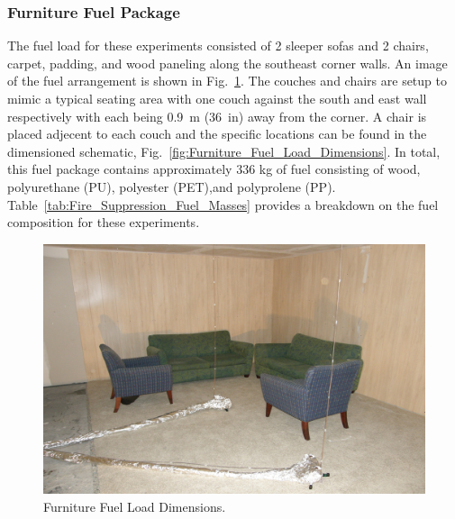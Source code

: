 \documentclass[12pt,oneside]{book}
\begin{document}
\clearpage

\subsubsection{Furniture Fuel Package}
\label{sec:fire_suppression_furniture_fuel}

The fuel load for these experiments consisted of 2 sleeper sofas and 2 chairs, carpet, padding, and wood paneling along the southeast corner walls. An image of the fuel arrangement is shown in Fig.~\ref{fig:Furniture_Fuel_Load}. The couches and chairs are setup to mimic a typical seating area with one couch against the south and east wall respectively with each being 0.9~m (36~in) away from the corner. A chair is placed adjecent to each couch and the specific locations can be found in the dimensioned schematic, Fig.~\ref{fig:Furniture_Fuel_Load_Dimensions}. In total, this fuel package contains approximately 336 kg of fuel consisting of wood, polyurethane (PU), polyester (PET),and polyprolene (PP). Table~\ref{tab:Fire_Suppression_Fuel_Masses} provides a breakdown on the fuel composition for these experiments.

\begin{figure}[!ht]
	\includegraphics[width=.8\columnwidth]{../Figures/Pictures/Furniture_Fuel_Load}
	\caption{Furniture Fuel Load Dimensions.}
	\label{fig:Furniture_Fuel_Load}
\end{figure}
\end{document}
